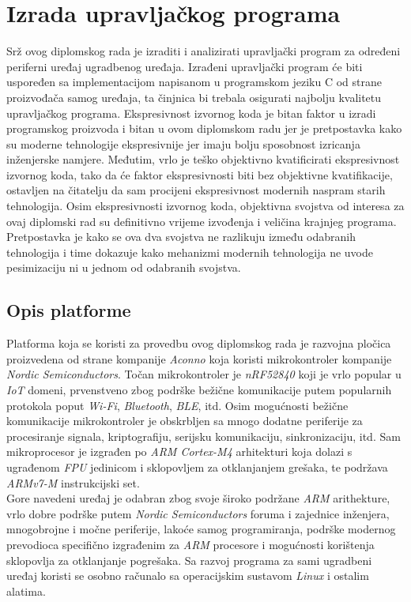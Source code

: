 \chapter{Izrada upravljačkog programa}
Srž ovog diplomskog rada je izraditi i analizirati upravljački program za određeni periferni uređaj ugradbenog uređaja. Izrađeni upravljački program će biti uspoređen sa implementacijom napisanom u programskom jeziku C od strane proizvođača samog uređaja, ta činjnica bi trebala osigurati najbolju kvalitetu upravljačkog programa. Ekspresivnost izvornog koda je bitan faktor u izradi programskog proizvoda i bitan u ovom diplomskom radu jer je pretpostavka kako su moderne tehnologije ekspresivnije jer imaju bolju sposobnost izricanja inženjerske namjere. Međutim, vrlo je teško objektivno kvatificirati ekspresivnost izvornog koda, tako da će faktor ekspresivnosti biti bez objektivne kvatifikacije, ostavljen na čitatelju da sam procijeni ekspresivnost modernih naspram starih tehnologija. Osim ekspresivnosti izvornog koda, objektivna svojstva od interesa za ovaj diplomski rad su definitivno vrijeme izvođenja i veličina krajnjeg programa. Pretpostavka je kako se ova dva svojstva ne razlikuju između odabranih tehnologija i time dokazuje kako mehanizmi modernih tehnologija ne uvode pesimizaciju ni u jednom od odabranih svojstva. 

\section{Opis platforme}
Platforma koja se koristi za provedbu ovog diplomskog rada je razvojna pločica proizvedena od strane kompanije \textit{Aconno} koja koristi mikrokontroler kompanije \textit{Nordic Semiconductors}. Točan mikrokontroler je \textit{nRF52840} koji je vrlo popular u \textit{IoT} domeni, prvenstveno zbog podrške bežične komunikacije putem popularnih protokola poput \textit{Wi-Fi}, \textit{Bluetooth}, \textit{BLE}, itd. Osim mogućnosti bežične komunikacije mikrokontroler je obskrbljen sa mnogo dodatne periferije za procesiranje signala, kriptografiju, serijsku komunikaciju, sinkronizaciju, itd. Sam mikroprocesor je izgrađen po \textit{ARM Cortex-M4} arhitekturi koja dolazi s ugrađenom \textit{FPU} jedinicom i sklopovljem za otklanjanjem grešaka, te podržava \textit{ARMv7-M} instrukcijski set. \\
Gore navedeni uređaj je odabran zbog svoje široko podržane \textit{ARM} arithekture, vrlo dobre podrške putem \textit{Nordic Semiconductors} foruma i zajednice inženjera, mnogobrojne i močne periferije, lakoće samog programiranja, podrške modernog prevodioca specifično izgrađenim za \textit{ARM} procesore i mogućnosti korištenja sklopovlja za otklanjanje pogrešaka. Sa razvoj programa za sami ugradbeni uređaj koristi se osobno računalo sa operacijskim sustavom \textit{Linux} i ostalim alatima. 

